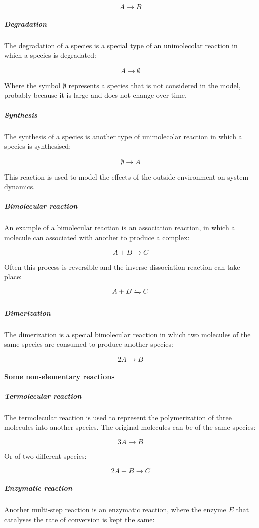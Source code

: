         $$A\rightarrow B$$

        \subparagraph{Degradation}
        The degradation of a species is a special type of an unimolecolar reaction in which a species is degradated:

        $$A\rightarrow\emptyset$$

        Where the symbol $\emptyset$ represents a species that is not considered in the model, probably because it is large and does not change over time.

        \subparagraph{Synthesis}
        The synthesis of a species is another type of unimolecolar reaction in which a species is synthesised:

        $$\emptyset\rightarrow A$$

        This reaction is used to model the effects of the outside environment on system dynamics.

        \subparagraph{Bimolecular reaction}
        An example of a bimolecular reaction is an association reaction, in which a molecule can associated with another to produce a complex:

        $$A+B\rightarrow C$$

        Often this process is reversible and the inverse dissociation reaction can take place:

        $$A+B\xleftrightharpoons[]{} C$$

        \subparagraph{Dimerization}
        The dimerization is a special bimolecular reaction in which two molecules of the same species are consumed to produce another species:

        $$2A\rightarrow B$$

      \paragraph{Some non-elementary reactions}

        \subparagraph{Termolecular reaction}
        The termolecular reaction is used to represent the polymerization of three molecules into another species.
        The original molecules can be of the same species:

        $$3A\rightarrow B$$

        Or of two different species:

        $$2A +B\rightarrow C$$

        \subparagraph{Enzymatic reaction}
        Another multi-step reaction is an enzymatic reaction, where the enzyme $E$ that catalyses the rate of conversion is kept the same:


